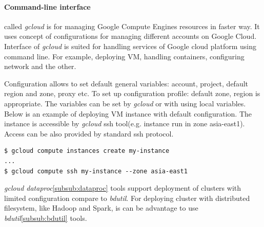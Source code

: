 \documentclass[a4paper,12pt,oneside]{report}
\begin{document}
\begin{table}[!htbp]
		\caption{Overview of Google Cloud platform}
		\label{tab:google_all}
	\end{table}
	
	\paragraph{Command-line interface} called \textit{gcloud}  is for managing
	Google Compute Engines resources in faster way. It uses concept of
	configurations for managing different accounts on Google Cloud. 
	Interface of \textit{gcloud} is suited for handling services of Google cloud
	platform using command line. For example, 
	deploying VM, handling containers, configuring network and the other.
	
	Configuration allows to set default general variables: account, project, default
	region 
	and zone, proxy etc. To set up configuration profile: default zone, region is
	appropriate. 
	The variables can be set by \textit{gcloud} or with using 
	local variables.
	Below is an example of deploying VM instance with default configuration. The
	instance 
	is accessible by \textit{gcloud} ssh tool(e.g. instance run in zone asia-east1).
	Access can be also provided 
	by standard ssh protocol.
	\begin{footnotesize}
		\begin{lstlisting}[style=mybash]
$ gcloud compute instances create my-instance
...
$ gcloud compute ssh my-instance --zone asia-east1
		\end{lstlisting}
	\end{footnotesize}
	\textit{gcloud dataproc}\ref{subsub:dataproc} tools support deployment of
	clusters with limited configuration compare to \textit{bdutil}. For deploying 
	cluster with distributed filesystem, like Hadoop and Spark, is can be advantage
	to use \textit{bdutil}\ref{subsub:bdutil} tools. 
	
\end{document}
